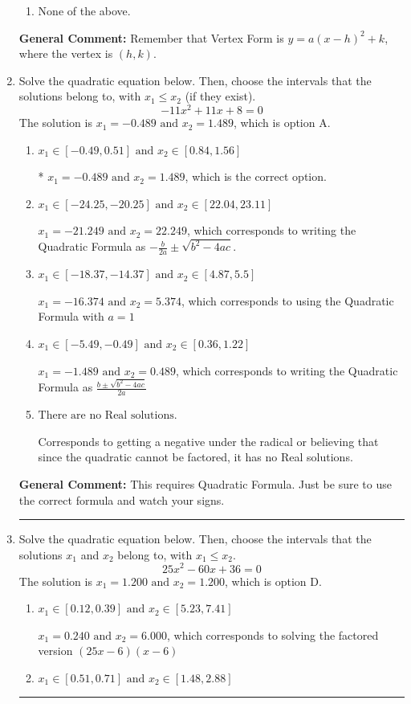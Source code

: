 \documentclass{extbook}[14pt]
\newcommand{\litem}[1]{\item #1

\rule{\textwidth}{0.4pt}}
\begin{document}
\begin{enumerate}
{\begin{enumerate}[label=\Alph*.]
\begin{multicols}{2}
\end{multicols}\item None of the above.\end{enumerate}
\textbf{General Comment:} Remember that Vertex Form is $y = a(x-h)^2+k$, where the vertex is $(h, k)$.
}
\litem{
Solve the quadratic equation below. Then, choose the intervals that the solutions belong to, with $x_1 \leq x_2$ (if they exist).
\[ -11x^{2} +11 x + 8 = 0 \]The solution is \( x_1 = -0.489 \text{ and } x_2 = 1.489 \), which is option A.\begin{enumerate}[label=\Alph*.]
\item \( x_1 \in [-0.49, 0.51] \text{ and } x_2 \in [0.84, 1.56] \)

* $x_1 = -0.489 \text{ and } x_2 = 1.489$, which is the correct option.
\item \( x_1 \in [-24.25, -20.25] \text{ and } x_2 \in [22.04, 23.11] \)

 $x_1 = -21.249 \text{ and } x_2 = 22.249$, which corresponds to writing the Quadratic Formula as $-\frac{b}{2a} \pm \sqrt{b^2 - 4ac}$.
\item \( x_1 \in [-18.37, -14.37] \text{ and } x_2 \in [4.87, 5.5] \)

 $x_1 = -16.374 \text{ and } x_2 = 5.374$, which corresponds to using the Quadratic Formula with $a=1$
\item \( x_1 \in [-5.49, -0.49] \text{ and } x_2 \in [0.36, 1.22] \)

 $x_1 = -1.489 \text{ and } x_2 = 0.489$, which corresponds to writing the Quadratic Formula as $\frac{b \pm \sqrt{b^2 - 4ac}}{2a}$
\item \( \text{There are no Real solutions.} \)

Corresponds to getting a negative under the radical or believing that since the quadratic cannot be factored, it has no Real solutions.
\end{enumerate}

\textbf{General Comment:} This requires Quadratic Formula. Just be sure to use the correct formula and watch your signs.
}
\litem{
Solve the quadratic equation below. Then, choose the intervals that the solutions $x_1$ and $x_2$ belong to, with $x_1 \leq x_2$.
\[ 25x^{2} -60 x + 36 = 0 \]The solution is \( x_1 = 1.200 \text{ and } x_2 = 1.200 \), which is option D.\begin{enumerate}[label=\Alph*.]
\item \( x_1 \in [0.12, 0.39] \text{ and } x_2 \in [5.23, 7.41] \)

$x_1 = 0.240 \text{ and } x_2 = 6.000$, which corresponds to solving the factored version $(25x -6)(x -6)$
\item \( x_1 \in [0.51, 0.71] \text{ and } x_2 \in [1.48, 2.88] \)


\end{enumerate}}
\end{enumerate}
\end{document}
